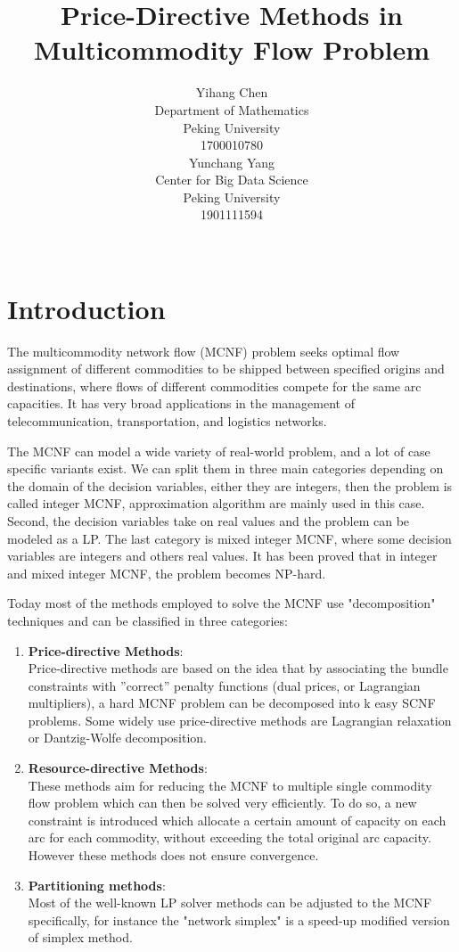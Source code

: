 \documentclass{article}
\title{Price-Directive Methods in \\Multicommodity Flow Problem}
\author{%
  Yihang Chen \\
  Department of Mathematics\\
  Peking University\\
  1700010780\\
  \And
  Yunchang Yang \\
  Center for Big Data Science\\
  Peking University\\
  1901111594\\
  \\
}
\begin{document}
\maketitle
\section{Introduction}
The multicommodity network flow (MCNF) problem seeks optimal flow assignment of different commodities to be
shipped between specified origins and destinations, where flows of different commodities compete for the same arc
capacities. It has very broad applications in the management of telecommunication, transportation, and logistics networks.

The MCNF can model a wide variety of real-world problem, and a lot of case specific
variants exist. We can split them in three main categories depending on the
domain of the decision variables, either they are integers, then the problem is called
integer MCNF, approximation algorithm are mainly used in this case. Second, the
decision variables take on real values and the problem can be modeled as a LP. The
last category is mixed integer MCNF, where some decision variables are integers and
others real values. It has been proved that in integer and mixed integer MCNF, the
problem becomes NP-hard.

Today most of the methods employed to solve the MCNF use "decomposition"
techniques and can be classified in three categories:
\begin{enumerate}
    \item {\bf Price-directive Methods}:\\
Price-directive methods are based on the idea that by associating the bundle constraints with ”correct” penalty functions
(dual prices, or Lagrangian multipliers), a hard MCNF problem can be decomposed into k easy SCNF problems. Some widely use price-directive methods are Lagrangian relaxation or Dantzig-Wolfe decomposition.

\item {\bf Resource-directive Methods}:\\
These methods aim for reducing the MCNF to multiple single commodity flow problem which can then be solved very efficiently. To do so, a new constraint
is introduced which allocate a certain amount of capacity on each arc for each
commodity, without exceeding the total original arc capacity. However these
methods does not ensure convergence.
\item {\bf Partitioning methods}:\\
Most of the well-known LP solver methods can be adjusted to the MCNF specifically,
for instance the "network simplex" is a speed-up modified version of
simplex method.
\end{enumerate}
\end{document}
